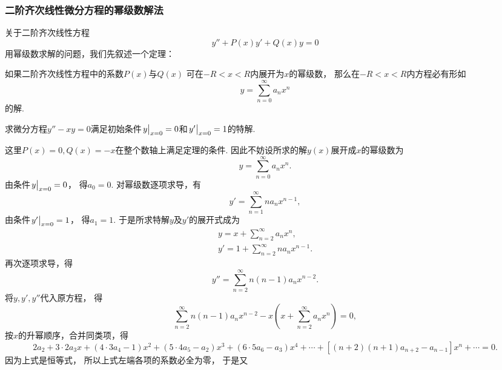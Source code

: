 \subsubsection{二阶齐次线性微分方程的幂级数解法}
关于二阶齐次线性方程\begin{equation*}
	y'' + P(x) y' + Q(x) y = 0
\end{equation*}用幂级数求解的问题，我们先叙述一个定理：
\begin{theorem}
如果二阶齐次线性方程中的系数\(P(x)\)与\(Q(x)\)
可在\(-R<x<R\)内展开为\(x\)的幂级数，
那么在\(-R<x<R\)内方程必有形如\begin{equation*}
	y = \sum_{n=0}^\infty a_n x^n
\end{equation*}的解.
\end{theorem}

\begin{example}
求微分方程\(y''-xy=0\)满足初始条件\(\eval{y}_{x=0}=0\)和\(\eval{y'}_{x=0}=1\)的特解.
\begin{solution}
这里\(P(x)=0, Q(x)=-x\)在整个数轴上满足定理的条件.
因此不妨设所求的解\(y(x)\)展开成\(x\)的幂级数为\begin{equation*}
	y = \sum_{n=0}^\infty a_n x^n.
\end{equation*}
由条件\(\eval{y}_{x=0}=0\)，
得\(a_0=0\).
对幂级数逐项求导，有\begin{equation*}
	y' = \sum_{n=1}^\infty n a_n x^{n-1},
\end{equation*}
由条件\(\eval{y'}_{x=0}=1\)，
得\(a_1=1\).
于是所求特解\(y\)及\(y'\)的展开式成为\begin{gather*}
	y = x + \sum_{n=2}^\infty a_n x^n, \\
	y' = 1 + \sum_{n=2}^\infty n a_n x^{n-1}.
\end{gather*}
再次逐项求导，得\begin{equation*}
	y'' = \sum_{n=2}^\infty n(n-1) a_n x^{n-2}.
\end{equation*}
将\(y,y',y''\)代入原方程，
得\begin{equation*}
	\sum_{n=2}^\infty n(n-1) a_n x^{n-2}
	- x \left( x + \sum_{n=2}^\infty a_n x^n \right)
	= 0,
\end{equation*}
按\(x\)的升幂顺序，合并同类项，得\begin{equation*}
	2 a_2 + 3\cdot2 a_3 x + (4\cdot3 a_4 - 1) x^2
	+ (5\cdot4 a_5 - a_2) x^3 + (6\cdot5 a_6 - a_3) x^4
	+ \dotsb + [(n+2)(n+1) a_{n+2} - a_{n-1}] x^n + \dotsb
	= 0.
\end{equation*}
因为上式是恒等式，
所以上式左端各项的系数必全为零，
于是又\begin{equation*}

\end{equation*}
\end{solution}
\end{example}
